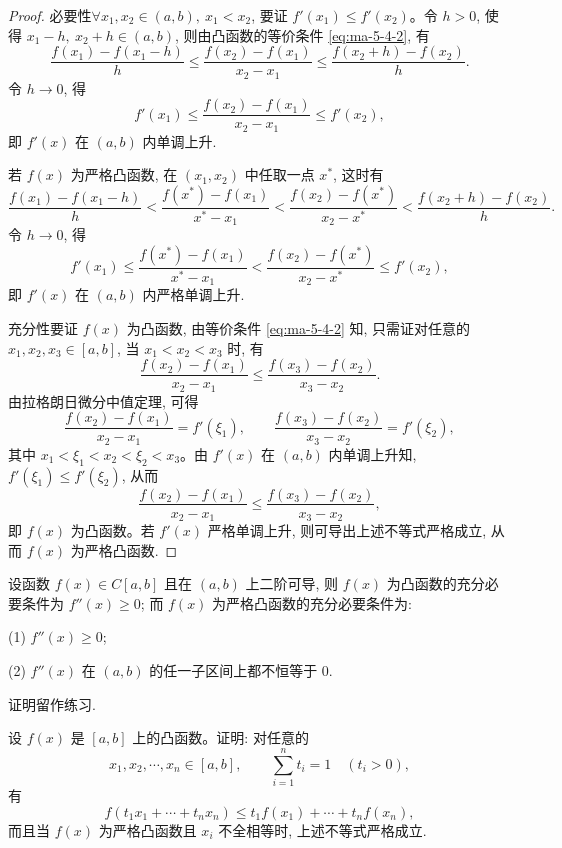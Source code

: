 \begin{proof}
必要性\quad $\forall x_1,x_2\in(a,b),\ x_1<x_2$, 要证 $f'(x_1)\leqslant f'(x_2)$。令 $h>0$, 使得 $x_1-h,\ x_2+h\in(a,b)$, 则由凸函数的等价条件 \eqref{eq:ma-5-4-2}, 有
\[
  \frac{f(x_1)-f(x_1-h)}{h}
  \leqslant
  \frac{f(x_2)-f(x_1)}{x_2-x_1}
  \leqslant
  \frac{f(x_2+h)-f(x_2)}{h}.
\]
令 $h\to0$, 得
\[
  f'(x_1)\leqslant\frac{f(x_2)-f(x_1)}{x_2-x_1}\leqslant f'(x_2),
\]
即 $f'(x)$ 在 $(a,b)$ 内单调上升.

若 $f(x)$ 为严格凸函数, 在 $(x_1,x_2)$ 中任取一点 $x^*$, 这时有
\[
  \frac{f(x_1)-f(x_1-h)}{h}
  <
  \frac{f(x^*)-f(x_1)}{x^*-x_1}
  <
  \frac{f(x_2)-f(x^*)}{x_2-x^*}
  <
  \frac{f(x_2+h)-f(x_2)}{h}.
\]
令 $h\to0$, 得
\[
  f'(x_1)\leqslant
  \frac{f(x^*)-f(x_1)}{x^*-x_1}
  <
  \frac{f(x_2)-f(x^*)}{x_2-x^*}
  \leqslant f'(x_2),
\]
即 $f'(x)$ 在 $(a,b)$ 内严格单调上升.

充分性\quad 要证 $f(x)$ 为凸函数, 由等价条件 \eqref{eq:ma-5-4-2} 知, 只需证对任意的 $x_1,x_2,x_3\in[a,b]$, 当 $x_1<x_2<x_3$ 时, 有
\[
  \frac{f(x_2)-f(x_1)}{x_2-x_1}
  \leqslant
  \frac{f(x_3)-f(x_2)}{x_3-x_2}.
\]
由拉格朗日微分中值定理, 可得
\[
  \frac{f(x_2)-f(x_1)}{x_2-x_1}=f'(\xi_1),\qquad
  \frac{f(x_3)-f(x_2)}{x_3-x_2}=f'(\xi_2),
\]
其中 $x_1<\xi_1<x_2<\xi_2<x_3$。由 $f'(x)$ 在 $(a,b)$ 内单调上升知, $f'(\xi_1)\leqslant f'(\xi_2)$, 从而
\[
  \frac{f(x_2)-f(x_1)}{x_2-x_1}
  \leqslant
  \frac{f(x_3)-f(x_2)}{x_3-x_2},
\]
即 $f(x)$ 为凸函数。若 $f'(x)$ 严格单调上升, 则可导出上述不等式严格成立, 从而 $f(x)$ 为严格凸函数.
\end{proof}


\begin{theorem}\label{theorem:ma-5-4-5}
设函数 $f(x)\in C[a,b]$ 且在 $(a,b)$ 上二阶可导, 则 $f(x)$ 为凸函数的充分必要条件为 $f''(x)\geqslant0$; 而 $f(x)$ 为严格凸函数的充分必要条件为:

(1) $f''(x)\geqslant0$;

(2) $f''(x)$ 在 $(a,b)$ 的任一子区间上都不恒等于 $0$.
\end{theorem}

证明留作练习.

\begin{example}\label{example:ma-5-4-8}
设 $f(x)$ 是 $[a,b]$ 上的凸函数。证明: 对任意的
\[
  x_1,x_2,\cdots,x_n\in[a,b],\qquad
  \sum_{i=1}^n t_i=1\quad (t_i>0),
\]
有
\[
  f(t_1x_1+\cdots+t_nx_n)\leqslant t_1f(x_1)+\cdots+t_nf(x_n),
\]
而且当 $f(x)$ 为严格凸函数且 $x_i$ 不全相等时, 上述不等式严格成立.
\end{example}


